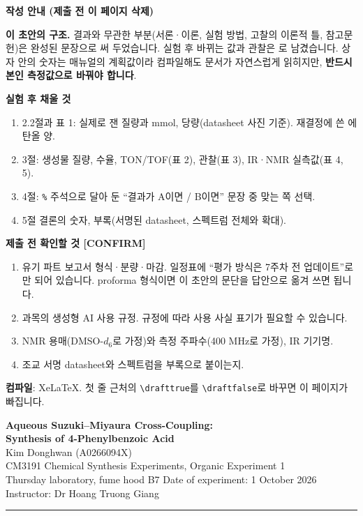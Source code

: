 \documentclass[11pt,a4paper]{article}
\newif\ifdraft \drafttrue
\newcommand{\res}[1]{\fcolorbox{black}{gray!18}{\footnotesize\sffamily #1}}
\begin{document}
\ifdraft
\thispagestyle{empty}
\begin{center}{\Large\bfseries 작성 안내 (제출 전 이 페이지 삭제)}\end{center}
\vspace{2mm}
\textbf{이 초안의 구조.} 결과와 무관한 부분(서론·이론, 실험 방법, 고찰의 이론적 틀, 참고문헌)은 완성된 문장으로 써 두었습니다. 실험 후 바뀌는 값과 관찰은 \res{회색 상자}로 남겼습니다. 상자 안의 숫자는 매뉴얼의 계획값이라 컴파일해도 문서가 자연스럽게 읽히지만, \textbf{반드시 본인 측정값으로 바꿔야 합니다}.

\textbf{실험 후 채울 것}
\begin{enumerate}[leftmargin=6mm,itemsep=0.5mm]
\item 2.2절과 표 1: 실제로 잰 질량과 mmol, 당량(datasheet 사진 기준). 재결정에 쓴 에탄올 양.
\item 3절: 생성물 질량, 수율, TON/TOF(표 2), 관찰(표 3), IR·NMR 실측값(표 4, 5).
\item 4절: \texttt{\%} 주석으로 달아 둔 ``결과가 A이면 / B이면'' 문장 중 맞는 쪽 선택.
\item 5절 결론의 숫자, 부록(서명된 datasheet, 스펙트럼 전체와 확대).
\end{enumerate}

\textbf{제출 전 확인할 것 [CONFIRM]}
\begin{enumerate}[leftmargin=6mm,itemsep=0.5mm]
\item 유기 파트 보고서 형식·분량·마감. 일정표에 ``평가 방식은 7주차 전 업데이트''로만 되어 있습니다. proforma 형식이면 이 초안의 문단을 답안으로 옮겨 쓰면 됩니다.
\item 과목의 생성형 AI 사용 규정. 규정에 따라 사용 사실 표기가 필요할 수 있습니다.
\item NMR 용매(DMSO-$d_6$로 가정)와 측정 주파수(400 MHz로 가정), IR 기기명.
\item 조교 서명 datasheet와 스펙트럼을 부록으로 붙이는지.
\end{enumerate}
\textbf{컴파일}: XeLaTeX. 첫 줄 근처의 \verb|\drafttrue|를 \verb|\draftfalse|로 바꾸면 이 페이지가 빠집니다.
\newpage
\setcounter{page}{1}
\fi

\begin{center}
{\LARGE\bfseries Aqueous Suzuki--Miyaura Cross-Coupling:\\[1mm] Synthesis of 4-Phenylbenzoic Acid}\\[4mm]
{\large Kim Donghwan (A0266094X)}\\[1mm]
CM3191 Chemical Synthesis Experiments, Organic Experiment 1\\
Thursday laboratory, fume hood B7 \quad\textbullet\quad Date of experiment: 1 October 2026\\
Instructor: Dr Hoang Truong Giang
\end{center}
\vspace{2mm}
\noindent\rule{\linewidth}{0.6pt}
\end{document}
